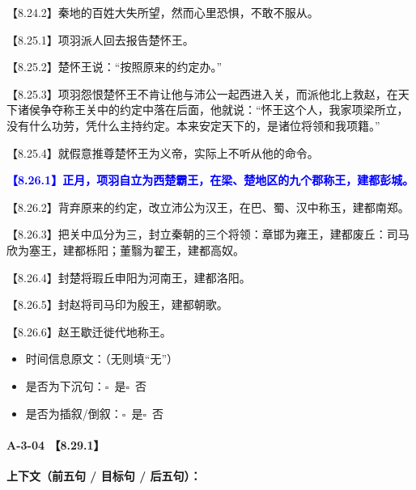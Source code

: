 \documentclass[fontset=none,11pt,a4paper]{ctexart}
\newcommand{\answerline}[1]{\underline{\hspace{#1}}}
\newcommand{\choicebox}[1]{$\square$~#1}
\begin{document}
\noindent 【8.24.2】秦地的百姓大失所望，然而心里恐惧，不敢不服从。\par
\noindent 【8.25.1】项羽派人回去报告楚怀王。\par
\noindent 【8.25.2】楚怀王说：“按照原来的约定办。”\par
\noindent 【8.25.3】项羽怨恨楚怀王不肯让他与沛公一起西进入关，而派他北上救赵，在天下诸侯争夺称王关中的约定中落在后面，他就说：“怀王这个人，我家项梁所立，没有什么功劳，凭什么主持约定。本来安定天下的，是诸位将领和我项籍。”\par
\noindent 【8.25.4】就假意推尊楚怀王为义帝，实际上不听从他的命令。\par
\noindent \textcolor{blue}{\textbf{【8.26.1】正月，项羽自立为西楚霸王，在梁、楚地区的九个郡称王，建都彭城。}}\par
\noindent 【8.26.2】背弃原来的约定，改立沛公为汉王，在巴、蜀、汉中称玉，建都南郑。\par
\noindent 【8.26.3】把关中瓜分为三，封立秦朝的三个将领：章邯为雍王，建都废丘：司马欣为塞王，建都栎阳；董翳为翟王，建都高奴。\par
\noindent 【8.26.4】封楚将瑕丘申阳为河南王，建都洛阳。\par
\noindent 【8.26.5】封赵将司马印为殷王，建都朝歌。\par
\noindent 【8.26.6】赵王歇迁徙代地称王。\par

\begin{itemize}
  \item 时间信息原文：\answerline{7.5cm}（无则填“无”）
  \item 是否为下沉句：\choicebox{是}\quad \choicebox{否}
  \item 是否为插叙/倒叙：\choicebox{是}\quad \choicebox{否}
\end{itemize}

\paragraph{A-3-04 \quad 【8.29.1】}
\textbf{上下文（前五句 / 目标句 / 后五句）：}
\end{document}
